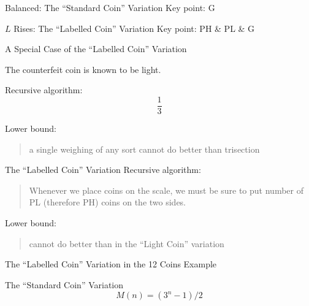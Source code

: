 \begin{frame}{Balanced: The ``Standard Coin'' Variation}
  Key point: G

\end{frame}

\begin{frame}{$L$ Rises: The ``Labelled Coin'' Variation}
  Key point: PH \& PL \& G

\end{frame}

\begin{frame}{A Special Case of the ``Labelled Coin'' Variation}
  \centerline{The counterfeit coin is known to be light.}

  Recursive algorithm: 
  \[
    \frac{1}{3}
  \]

  Lower bound: 
  \begin{quote}
    a single weighing of any sort cannot do better than trisection
  \end{quote}
\end{frame}

\begin{frame}{The ``Labelled Coin'' Variation}
  Recursive algorithm:
  \begin{quote}
    Whenever we place coins on the scale, 
    we must be sure to put  number of PL (therefore PH) coins on the two sides.
  \end{quote}

  Lower bound:
  \begin{quote}
    cannot do better than in the ``Light Coin'' variation
  \end{quote}
\end{frame}

\begin{frame}{The ``Labelled Coin'' Variation in the 12 Coins Example}
\end{frame}

\begin{frame}{The ``Standard Coin'' Variation}
  \[
    M(n) = (3^n - 1) / 2
  \]
\end{frame}

\begin{frame}{}
\end{frame}

